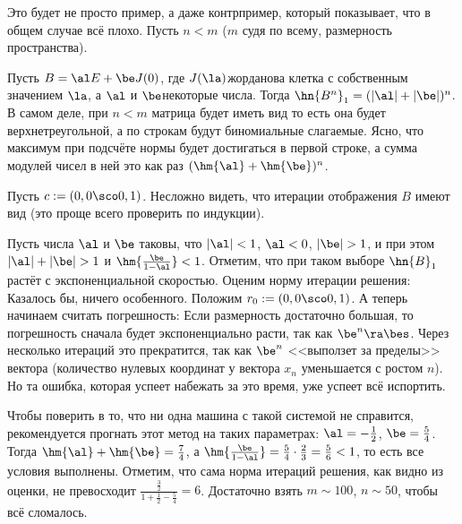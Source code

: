 \documentclass[a4paper]{article}
\begin{document}
\begin{ex}
Это будет не просто пример, а даже контрпример, который показывает, что в общем случае всё плохо.
Пусть $n < m$ ($m$ судя по всему, размерность пространства).

Пусть $B = \al E + \be J(0)$, где $J(\la)$\т жорданова клетка с собственным значением $\la$, а $\al$ и $\be$\т некоторые числа.
Тогда $\hn{B^n}_1 = (|\al|+|\be|)^n$. В самом деле, при $n < m$ матрица будет иметь вид
то есть она будет верхнетреугольной, а по строкам будут биномиальные слагаемые.
Ясно, что максимум при подсчёте нормы будет достигаться в первой строке, а сумма модулей чисел в ней\т
это как раз $(\hm{\al} + \hm{\be})^n$.

Пусть $c := (0,0\sco0, 1)$.
Несложно видеть, что итерации отображения $B$ имеют вид
(это проще всего проверить по индукции).

Пусть числа $\al$ и $\be$ таковы, что $|\al| <1$, $\al < 0$, $|\be|>1$, и при этом $|\al|+|\be| > 1$ и $\hm{\frac{\be}{1-\al}} <1$.
Отметим, что при таком выборе $\hn{B}_1$ растёт с экспоненциальной скоростью.
Оценим норму итерации решения:
Казалось бы, ничего особенного. Положим $r_0 := (0,0\sco 0,1)$. А теперь начинаем считать погрешность:
Если размерность достаточно большая, то погрешность сначала будет экспоненциально расти, так как $\be^n\ra\bes$. Через несколько
итераций это прекратится, так как $\be^n$ <<выползет за пределы>> вектора (количество нулевых координат у вектора $x_n$ уменьшается
с ростом $n$). Но та ошибка, которая успеет набежать за это время, уже успеет всё испортить.

Чтобы поверить в то, что ни одна машина с такой системой не справится, рекомендуется прогнать
этот метод на таких параметрах: $\al = -\frac12$, $\be = \frac54$. Тогда $\hm{\al} + \hm{\be} = \frac74$,
а $\hm{\frac{\be}{1-\al}} = \frac{5}{4}\cdot\frac{2}{3} = \frac{5}{6} < 1$, то есть все условия выполнены.
Отметим, что сама норма итераций решения, как видно из оценки, не превосходит $\frac{\frac{3}{2}}{1 + \frac12 - \frac54} = 6$.
Достаточно взять $m \sim 100$, $n \sim 50$, чтобы всё сломалось.
\end{ex}
\end{document}

